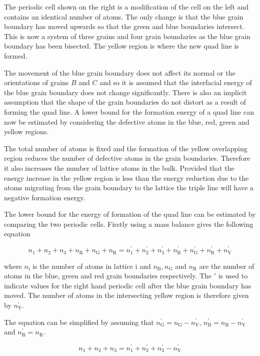 \documentclass[12pt,a4paper,openany]{report}
\newcommand{\ts}[1]{\textrm{#1}}
\begin{document}
The periodic cell shown on the right is a modification of the cell on the left and contains an identical number of atoms. The only change is that the blue grain boundary has moved upwards so that the green and blue boundaries intersect. This is now a system of three grains and four grain boundaries as the blue grain boundary has been bisected. The yellow region is where the new quad line is formed.

The movement of the blue grain boundary does not affect its normal  or the orientations of grains $B$ and $C$ and so it is assumed that the interfacial energy of the blue grain boundary does not change significantly. There is also an implicit assumption that the shape of the grain boundaries do not distort as a result of forming the quad line. A lower bound for the formation energy of a quad line can now be estimated by considering the defective atoms in the blue, red, green and yellow regions.

The total number of atoms is fixed and the formation of the yellow overlapping region reduces the number of defective atoms in the grain boundaries. Therefore it also increases the number of lattice atoms in the bulk. Provided that the energy increase in the yellow region is less than the energy reduction due to the atoms migrating from the grain boundary to the lattice the triple line will have a negative formation energy. 
 
The lower bound for the energy of formation of the quad line can be estimated by comparing the two periodic cells. Firstly using a mass balance gives the following equation

\[ n_1 + n_2 + n_3 + n_{\ts{B}} + n_{\ts{G}} + n_{\ts{R}} = n_1^{\prime} + n_2^{\prime} + n_3^{\prime} + n_{\ts{B}}^{\prime} + n_{\ts{G}}^{\prime} + n_{\ts{R}}^{\prime} +
n_{\ts{Y}}^{\prime} \]

where $n_{\ts{i}}$ is the number of atoms in lattice $\ts{i}$ and $n_{\ts{B}}, n_{\ts{G}}$ and $n_{\ts{R}}$ are the number of atoms in the blue, green and red grain boundaries respectively. The $\prime$ is used to indicate values for the right hand periodic cell after the blue grain boundary has moved.  The number of atoms in the intersecting yellow region is therefore given by $n_{\ts{Y}}^{\prime}$.

The equation can be simplified by assuming that $n_{\ts{G}}^{\prime} = n_{\ts{G}}-n_{\ts{Y}}^{\prime}$, $n_{\ts{B}}^{\prime} = n_{\ts{B}}-n_{\ts{Y}}^{\prime}$ and $n_{\ts{R}}^{\prime} = n_{\ts{R}}$. 

\[ n_1 + n_2 + n_3   = n_1^{\prime} + n_2^{\prime} + n_3^{\prime}- n_{\ts{Y}}^{\prime} \]
\end{document}
